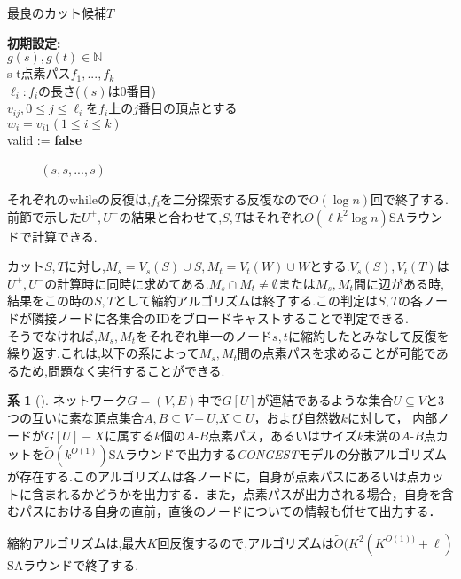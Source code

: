 \documentclass{thesis}
\theoremstyle{definition}
\newtheorem{corollary}{系}
\begin{document}
\begin{algorithm}[H]
  \caption{最良のカット候補$T$} 
  \textbf{初期設定:} \\
  $g(s),g(t)\in \mathbb{N}$ \\
  s-t点素パス$f_1,...,f_k$ \\
  $\ell_i:f_i$の長さ($(s)$は0番目) \\
  $v_{ij},0 \leq j \leq \ell_i$を$f_i$上の$j$番目の頂点とする \\
  $w_i=v_{i1}(1\leq i \leq k)$ \\
  valid := \textbf{false} \\ 
  {\setlength{\baselineskip}{12pt}
  \begin{algorithmic}[1]
       
       
           
           
          \Else
          \EndIf　
          \EndWhile　
    \EndFor
    \Else
     $(s,s,...,s)$
    \EndIf
  \end{algorithmic}
  }
\end{algorithm}

それぞれのwhileの反復は,$f_i$を二分探索する反復なので$O(\log n)$回で終了する.前節で示した$U^+,U^-$の結果と合わせて,$S,T$はそれぞれ$O(\ell k^2 \log n)$SAラウンドで計算できる.\par
カット$S,T$に対し,$M_s = V_s(S) \cup S,M_t = V_t(W) \cup W$とする.$V_s(S),V_t(T)$は$U^+,U^-$の計算時に同時に求めてある.$M_s \cap M_t \neq \emptyset $または$M_s,M_t$間に辺がある時,結果をこの時の$S,T$として縮約アルゴリズムは終了する.この判定は$S,T$の各ノードが隣接ノードに各集合のIDをブロードキャストすることで判定できる.\\
そうでなければ,$M_s,M_t$をそれぞれ単一のノード$s,t$に縮約したとみなして反復を繰り返す.これは,以下の系によって$M_s,M_t$間の点素パスを求めることが可能であるため,問題なく実行することができる.

  \begin{corollary}[\cite{li2018distributed}] 
    ネットワーク$G=(V,E)$中で$G[U]$が連結であるような集合$U \subseteq V$と3つの互いに素な頂点集合$A,B \subseteq V - U$,$X \subseteq U$，および自然数$k$に対して，
    内部ノードが$G[U] - X$に属する$k$個の$A$-$B$点素パス，あるいはサイズ$k$未満の$A$-$B$点カットを$\tilde{O}(k^{O(1)})$SAラウンドで出力する\textit{CONGEST}モデルの分散アルゴリズムが存在する.このアルゴリズムは各ノードに，自身が点素パスにあるいは点カットに含まれるかどうかを出力する．また，点素パスが出力される場合，自身を含むパスにおける自身の直前，直後のノードについての情報も併せて出力する．
\end{corollary}
\par
縮約アルゴリズムは,最大$K$回反復するので,アルゴリズムは$\tilde{O}(K^2(K^{O(1))}+\ell)$SAラウンドで終了する.
\end{document}
